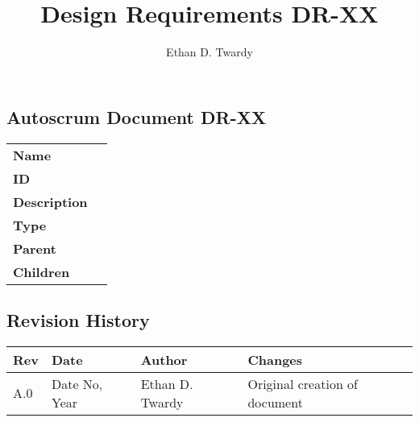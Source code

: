 \documentclass[12pt]{article}
\title{Design Requirements DR-XX}
\author{Ethan D. Twardy}
\begin{document}
\doublespacing

\subsection*{Autoscrum Document DR-XX}
\begin{tabular}{l p{377pt}}
  \textbf{Name} \\
  \textbf{ID} \\
  \textbf{Description} \\
  \textbf{Type} \\
  \textbf{Parent} \\
  \textbf{Children} \\
\end{tabular}

\pagebreak
\subsection*{Revision History}
\begin{centering}
  \begin{tabular}{|l|l|l|l|}
    \hline
    Rev & Date & Author & Changes \\
    \hline \hline
    A.0 & Date No, Year & Ethan D. Twardy &
    Original creation of document \\
    \hline
  \end{tabular}
\end{centering}
\end{document}
